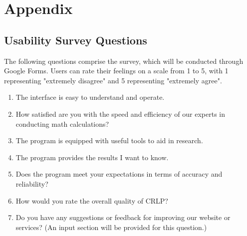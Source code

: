\documentclass[12pt, titlepage]{article}
\begin{document}
\section{Appendix}

\subsection{Usability Survey Questions}
\label{sec:survey}
The following questions comprise the survey, which will be conducted through Google Forms. Users can rate their feelings on a scale from 1 to 5, with 1 representing "extremely disagree" and 5 representing "extremely agree".

\begin{enumerate}
    \item The interface is easy to understand and operate.
    \item How satisfied are you with the speed and efficiency of our experts in conducting math calculations?
    \item The program is equipped with useful tools to aid in research.
    \item The program provides the results I want to know.
    \item Does the program meet your expectations in terms of accuracy and reliability?
    \item How would you rate the overall quality of CRLP?
    \item Do you have any suggestions or feedback for improving our website or services? (An input section will be provided for this question.)
\end{enumerate}
\end{document}
